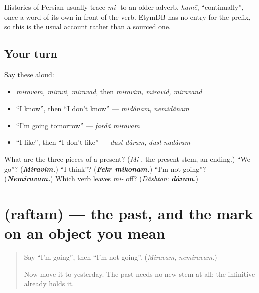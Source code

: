 \begin{cousinweb}
Histories of Persian usually trace \emph{mi-} to an older adverb, \emph{hamē}, \textquotedblleft{}continually\textquotedblright{}, once a word of its own in front of the verb. EtymDB has no entry for the prefix, so this is the usual account rather than a sourced one.
\end{cousinweb}

\subsection*{Your turn}
Say these aloud:

\begin{itemize}
\raggedright
  \item \emph{miravam, miravi, miravad}, then \emph{miravim, miravid, miravand}
  \item \textquotedblleft{}I know\textquotedblright{}, then \textquotedblleft{}I don't know\textquotedblright{} — \emph{midânam}, \emph{nemidânam}
  \item \textquotedblleft{}I'm going tomorrow\textquotedblright{} — \emph{fardâ miravam}
  \item \textquotedblleft{}I like\textquotedblright{}, then \textquotedblleft{}I don't like\textquotedblright{} — \emph{dust dâram}, \emph{dust nadâram}
\end{itemize}

\begin{tcolorbox}[breakable,colback=teal!4,colframe=teal!35!black,title={Before you move on}]
What are the three pieces of a present? (\emph{Mi-}, the present stem, an ending.) \textquotedblleft{}We go\textquotedblright{}? (\emph{\textbf{Miravim.}}) \textquotedblleft{}I think\textquotedblright{}? (\emph{\textbf{Fekr mikonam.}}) \textquotedblleft{}I'm not going\textquotedblright{}? (\emph{\textbf{Nemiravam.}}) Which verb leaves \emph{mi-} off? (\emph{Dâshtan}: \emph{\textbf{dâram}}.)
\end{tcolorbox}
\section[\texorpdfstring{\fa{رفتم} (raftam)}{رفتم (raftam)}]{ (raftam) — the past, and the mark on an object you mean}

\label{lesson:FA-C290-raftam}



\begin{quote}
Say \textquotedblleft{}I'm going\textquotedblright{}, then \textquotedblleft{}I'm not going\textquotedblright{}. (\emph{Miravam}, \emph{nemiravam}.)

Now move it to yesterday. The past needs no new stem at all: the infinitive already holds it.
\end{quote}

